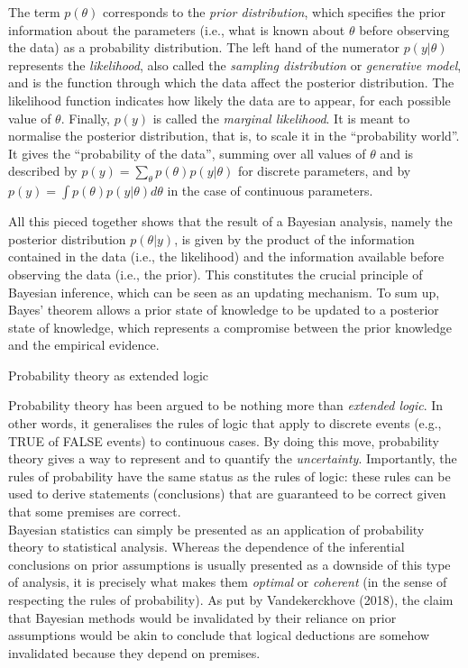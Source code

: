 \documentclass[a4paper,12pt,twoside,openright,oldfontcommands]{memoir}
\begin{document}
The term \(p(\theta)\) corresponds to the \emph{prior distribution},
which specifies the prior information about the parameters (i.e., what
is known about \(\theta\) before observing the data) as a probability
distribution. The left hand of the numerator \(p(y|\theta)\) represents
the \emph{likelihood}, also called the \emph{sampling distribution} or
\emph{generative model}, and is the function through which the data
affect the posterior distribution. The likelihood function indicates how
likely the data are to appear, for each possible value of \(\theta\).
Finally, \(p(y)\) is called the \emph{marginal likelihood}. It is meant
to normalise the posterior distribution, that is, to scale it in the
``probability world''. It gives the ``probability of the data'', summing
over all values of \(\theta\) and is described by
\(p(y) = \sum_{\theta} p(\theta) p(y|\theta)\) for discrete parameters,
and by \(p(y) = \int p(\theta) p(y|\theta) d\theta\) in the case of
continuous parameters.

All this pieced together shows that the result of a Bayesian analysis,
namely the posterior distribution \(p(\theta|y)\), is given by the
product of the information contained in the data (i.e., the likelihood)
and the information available before observing the data (i.e., the
prior). This constitutes the crucial principle of Bayesian inference,
which can be seen as an updating mechanism. To sum up, Bayes' theorem
allows a prior state of knowledge to be updated to a posterior state of
knowledge, which represents a compromise between the prior knowledge and
the empirical evidence.

\vspace{2mm}

\begin{mybox}[label = logic]{Probability theory as extended logic}

Probability theory has been argued to be nothing more than \textit{extended logic}. In other words, it generalises the rules of logic that apply to discrete events (e.g., TRUE of FALSE events) to continuous cases. By doing this move, probability theory gives a way to represent and to quantify the \textit{uncertainty}. Importantly, the rules of probability have the same status as the rules of logic: these rules can be used to derive statements (conclusions) that are guaranteed to be correct given that some premises are correct.\\

Bayesian statistics can simply be presented as an application of probability theory to statistical analysis. Whereas the dependence of the inferential conclusions on prior assumptions is usually presented as a downside of this type of analysis, it is precisely what makes them \textit{optimal} or \textit{coherent} (in the sense of respecting the rules of probability). As put by Vandekerckhove (2018), the claim that Bayesian methods would be invalidated by their reliance on prior assumptions would be akin to conclude that logical deductions are somehow invalidated because they depend on premises.

\end{mybox}
\end{document}
